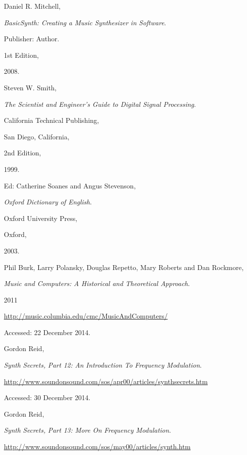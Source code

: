 \begin{thebibliography}{9}


  Daniel R. Mitchell,

  \emph{BasicSynth: Creating a Music Synthesizer in Software}.

  Publisher: Author.

  1st Edition,

  2008.


  Steven W. Smith,

  \emph{The Scientist and Engineer's Guide to Digital Signal Processing}.

  California Technical Publishing,

  San Diego, California,

  2nd Edition,

  1999.


  Ed: Catherine Soanes and Angus Stevenson,

  \emph{Oxford Dictionary of English}.

  Oxford University Press,

  Oxford,

  2003.


  Phil Burk, Larry Polansky, Douglas Repetto, Mary Roberts and Dan Rockmore,

  \emph{Music and Computers: A Historical and Theoretical Approach}.

  2011

  \url{http://music.columbia.edu/cmc/MusicAndComputers/}

  Accessed: 22 December 2014.


  Gordon Reid,

  \emph{Synth Secrets, Part 12: An Introduction To Frequency Modulation}.

  \url{http://www.soundonsound.com/sos/apr00/articles/synthsecrets.htm}

  Accessed: 30 December 2014.


  Gordon Reid,

  \emph{Synth Secrets, Part 13: More On Frequency Modulation}.

  \url{http://www.soundonsound.com/sos/may00/articles/synth.htm}


\end{thebibliography}

